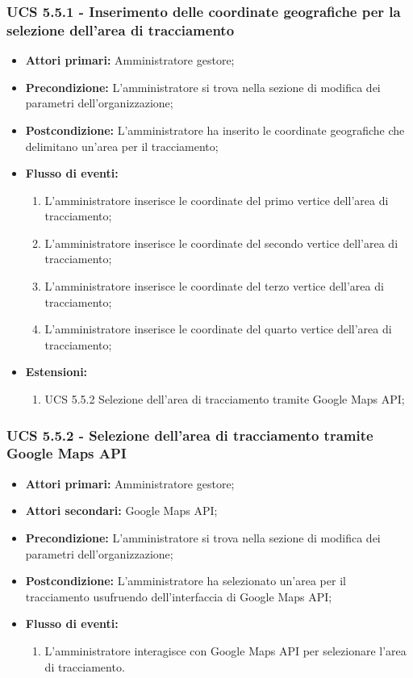 \subsubsection{UCS 5.5.1 - Inserimento delle coordinate geografiche per la selezione dell'area di tracciamento}%
\begin{itemize}
\item \textbf{Attori primari:} Amministratore gestore;
\item \textbf{Precondizione:} L'amministratore si trova nella sezione di modifica dei parametri dell'organizzazione;
\item \textbf{Postcondizione:} L'amministratore ha inserito le coordinate geografiche che delimitano un'area per il tracciamento;
\item \textbf{Flusso di eventi:}
\begin{enumerate}
    \item L'amministratore inserisce le coordinate del primo vertice dell'area di tracciamento;
    \item L'amministratore inserisce le coordinate del secondo vertice dell'area di tracciamento;
    \item L'amministratore inserisce le coordinate del terzo vertice dell'area di tracciamento;
    \item L'amministratore inserisce le coordinate del quarto vertice dell'area di tracciamento;
\end{enumerate}
\item \textbf{Estensioni:}
\begin{enumerate}
    \item UCS 5.5.2 Selezione dell'area di tracciamento tramite Google Maps API;
\end{enumerate}
\end{itemize}

\subsubsection{UCS 5.5.2 - Selezione dell'area di tracciamento tramite Google Maps API}%
\begin{itemize}
\item \textbf{Attori primari:} Amministratore gestore;
\item \textbf{Attori secondari:} Google Maps API;
\item \textbf{Precondizione:} L'amministratore si trova nella sezione di modifica dei parametri dell'organizzazione;
\item \textbf{Postcondizione:} L'amministratore ha selezionato un'area per il tracciamento usufruendo dell'interfaccia di Google Maps API;
\item \textbf{Flusso di eventi:}
\begin{enumerate}
    \item L'amministratore interagisce con Google Maps API per selezionare l'area di tracciamento.
\end{enumerate}
\end{itemize}